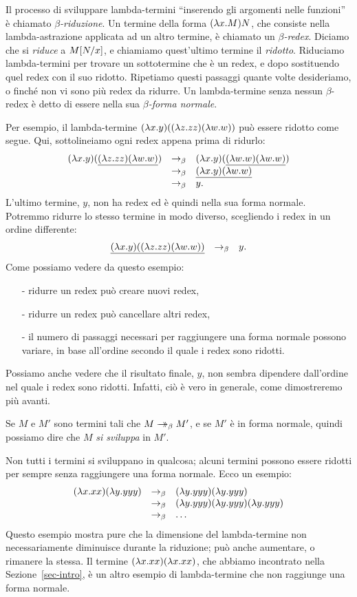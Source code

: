 \documentclass{article}
\begin{document}
Il processo di sviluppare lambda-termini ``inserendo gli argomenti
nelle funzioni'' \`e chiamato {\em $\beta$-riduzione}. Un termine della
forma $(\lambda x.M)N$, che consiste nella lambda-astrazione applicata ad un
altro termine, \`e chiamato un {\em $\beta$-redex}. Diciamo che si
{\em riduce} a $M[N/x]$, e chiamiamo quest'ultimo termine il {\em
  ridotto}. Riduciamo lambda-termini per trovare un sottotermine che \`e
un redex, e dopo sostituendo quel redex con il suo ridotto. Ripetiamo
questi passaggi quante volte desideriamo, o finch\'e non vi sono pi\`u redex
da ridurre. Un lambda-termine senza nessun $\beta$-redex \`e detto di essere
nella sua {\em $\beta$-forma normale}.

Per esempio, il lambda-termine $(\lambda x.y)((\lambda z.zz)(\lambda w.w))$ pu\`o
essere ridotto come segue. Qui, sottolineiamo ogni redex appena prima
di ridurlo:
\[ \begin{array}{lll}
  (\lambda x.y)(\underline{(\lambda z.zz)(\lambda w.w)}) 
  &\rightarrow_{\beta}& (\lambda x.y)(\underline{(\lambda w.w)(\lambda w.w)}) \\
  &\rightarrow_{\beta}& \underline{(\lambda x.y)(\lambda w.w)} \\
  &\rightarrow_{\beta}& y.
\end{array}
\]
L'ultimo termine, $y$, non ha redex ed \`e quindi nella sua forma normale.
Potremmo ridurre lo stesso termine in modo diverso, scegliendo i redex
in un ordine differente:
\[ \begin{array}{lll}
  \underline{(\lambda x.y)((\lambda z.zz)(\lambda w.w))}
  &\rightarrow_{\beta}& y.
\end{array}
\]
Come possiamo vedere da questo esempio:
\begin{itemize}
\item[-] ridurre un redex pu\`o creare nuovi redex,
\item[-] ridurre un redex pu\`o cancellare altri redex,
\item[-] il numero di passaggi necessari per raggiungere una forma normale
possono variare, in base all'ordine secondo il quale i redex sono ridotti.
\end{itemize}
Possiamo anche vedere che il risultato finale, $y$, non sembra dipendere
dall'ordine nel quale i redex sono ridotti. Infatti, ci\`o \`e vero in generale,
come dimostreremo pi\`u avanti.

Se $M$ e $M'$ sono termini tali che $M\mathrel{\rightarrow\!\!\!\!\!\rightarrow}_{\beta} M'$, e se $M'$ \`e in
forma normale, quindi possiamo dire che $M$ {\em si sviluppa} in $M'$.

Non tutti i termini si sviluppano in qualcosa; alcuni termini
possono essere ridotti per sempre senza raggiungere una forma normale.
Ecco un esempio:
\[ \begin{array}{lll}
  (\lambda x.xx)(\lambda y.yyy) 
  &\rightarrow_{\beta}& (\lambda y.yyy)(\lambda y.yyy) \\
  &\rightarrow_{\beta}& (\lambda y.yyy)(\lambda y.yyy)(\lambda y.yyy) \\
  &\rightarrow_{\beta}& \ldots
\end{array}
\]
Questo esempio mostra pure che la dimensione del lambda-termine non
necessariamente diminuisce durante la riduzione; pu\`o anche aumentare,
o rimanere la stessa. Il termine $(\lambda x.xx)(\lambda x.xx)$, che abbiamo
incontrato nella Sezione~\ref{sec-intro}, \`e un altro esempio di
lambda-termine che non raggiunge una forma normale.
\end{document}
